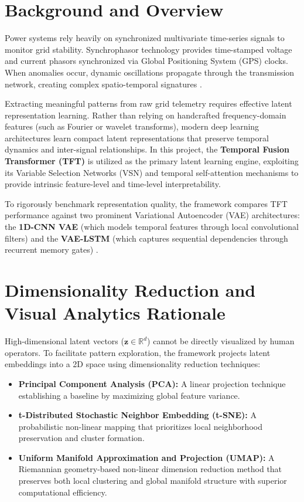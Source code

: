 \documentclass[12pt,a4paper]{report}
\begin{document}
\section{Background and Overview}
Power systems rely heavily on synchronized multivariate time-series signals to monitor grid stability. Synchrophasor technology provides time-stamped voltage and current phasors synchronized via Global Positioning System (GPS) clocks. When anomalies occur, dynamic oscillations propagate through the transmission network, creating complex spatio-temporal signatures \cite{ref_biswal2023_realtime}.

Extracting meaningful patterns from raw grid telemetry requires effective latent representation learning. Rather than relying on handcrafted frequency-domain features (such as Fourier or wavelet transforms), modern deep learning architectures learn compact latent representations that preserve temporal dynamics and inter-signal relationships. In this project, the \textbf{Temporal Fusion Transformer (TFT)} \cite{ref_lim2021_tft} is utilized as the primary latent learning engine, exploiting its Variable Selection Networks (VSN) and temporal self-attention mechanisms to provide intrinsic feature-level and time-level interpretability.

To rigorously benchmark representation quality, the framework compares TFT performance against two prominent Variational Autoencoder (VAE) architectures: the \textbf{1D-CNN VAE} (which models temporal features through local convolutional filters) and the \textbf{VAE-LSTM} (which captures sequential dependencies through recurrent memory gates) \cite{ref_adv_vae2024, ref_su2019_omnianomaly}.

\section{Dimensionality Reduction and Visual Analytics Rationale}
High-dimensional latent vectors ($\mathbf{z} \in \mathbb{R}^d$) cannot be directly visualized by human operators. To facilitate pattern exploration, the framework projects latent embeddings into a 2D space using dimensionality reduction techniques:
\begin{itemize}
    \item \textbf{Principal Component Analysis (PCA):} A linear projection technique establishing a baseline by maximizing global feature variance.
    \item \textbf{t-Distributed Stochastic Neighbor Embedding (t-SNE):} A probabilistic non-linear mapping that prioritizes local neighborhood preservation and cluster formation.
    \item \textbf{Uniform Manifold Approximation and Projection (UMAP):} A Riemannian geometry-based non-linear dimension reduction method that preserves both local clustering and global manifold structure with superior computational efficiency.
\end{itemize}
\end{document}
